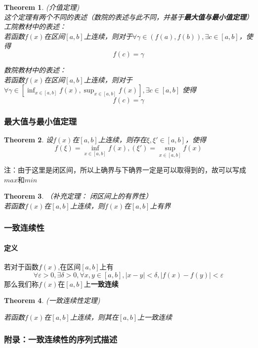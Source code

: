 \documentclass[11pt,hyperref,a4paper,UTF8]{ctexart}
\newtheorem{theorem}{Theorem}[subsection]
\begin{document}
\begin{CJK}{UTF8}{gkai}
\begin{theorem}(介值定理)\\
这个定理有两个不同的表述（数院的表述与此不同，并基于\textbf{最大值与最小值定理}）\\
工院教材中的表述：\\
若函数$f(x)$在区间$[a,b]$上连续，则对于$\forall \gamma\in(f(a),f(b)),\exists c\in[a,b]$，使得
\[f(c)=\gamma\]

数院教材中的表述：\\
若函数$f(x)$在区间$[a,b]$上连续，则对于$\forall \gamma\in[\inf_{x\in[a,b]}f(x),\sup_{x\in[a,b]}f(x)],\exists c\in [a,b]$
使得
\[f(c)=\gamma\]
\end{theorem}

\subsubsection{最大值与最小值定理}
\begin{theorem}

设$f(x)$在$[a,b]$上连续，则存在$\xi ,\xi'\in[a,b]$，使得
\[f(\xi)=\inf_{x\in[a,b]}f(x),(\xi')=\sup_{x\in[a,b]}f(x)\]
\end{theorem}
注：由于这里是闭区间，所以上确界与下确界一定是可以取得到的，故可以写成$max$和$min$\\

\begin{theorem}（补充定理： 闭区间上的有界性）\\
若函数$f(x)$在$[a,b]$上连续，则$f(x)$在$[a,b]$上有界\\
\end{theorem}

\subsubsection{一致连续性}
\paragraph{定义\\}
若对于函数$f(x)$,在区间$[a,b]$上有
\[\forall \varepsilon>0,\exists \delta >0,\forall x,y\in[a,b],|x-y|<\delta,|f(x)-f(y)|<\varepsilon\]
那么我们称$f(x)$在$[a,b]$上\textbf{一致连续}\\
\begin{theorem}(一致连续性定理)

若函数$f(x)$在$[a,b]$上连续，则其在$[a,b]$上一致连续\\
\end{theorem}
\subsubsection*{附录：一致连续性的序列式描述}


\end{CJK}
\end{document}
